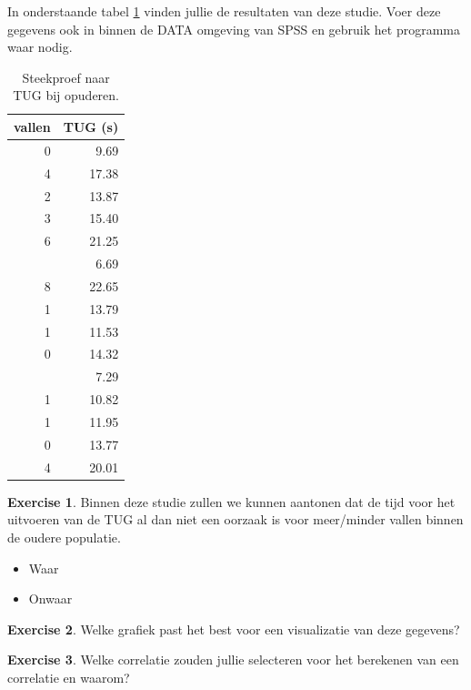 \documentclass[
]{book}
\providecommand{\tightlist}{%
  \setlength{\itemsep}{0pt}\setlength{\parskip}{0pt}}
\theoremstyle{definition}
\theoremstyle{definition}
\theoremstyle{definition}
\newtheorem{exercise}{Exercise}[chapter]
\theoremstyle{definition}
\theoremstyle{remark}
\begin{document}
In onderstaande tabel \ref{tab:TUG} vinden jullie de resultaten van deze studie. Voer deze gegevens ook in binnen de DATA omgeving van {SPSS} en gebruik het programma waar nodig.

\begin{table}

\caption{\label{tab:TUG}Steekproef naar TUG bij opuderen.}
\centering
\begin{tabular}[t]{rr}
\toprule
vallen & TUG (s)\\
\midrule
0 & 9.69\\
4 & 17.38\\
2 & 13.87\\
3 & 15.40\\
6 & 21.25\\
\addlinespace
1 & 6.69\\
8 & 22.65\\
1 & 13.79\\
1 & 11.53\\
0 & 14.32\\
\addlinespace
0 & 7.29\\
1 & 10.82\\
1 & 11.95\\
0 & 13.77\\
4 & 20.01\\
\bottomrule
\end{tabular}
\end{table}

\begin{exercise}

Binnen deze studie zullen we kunnen aantonen dat de tijd voor het uitvoeren van de TUG al dan niet een oorzaak is voor meer/minder vallen binnen de oudere populatie.

\begin{itemize}
\tightlist
\item
  Waar
\item
  Onwaar
\end{itemize}

\end{exercise}

\begin{exercise}
Welke grafiek past het best voor een visualizatie van deze gegevens?
\end{exercise}

\begin{exercise}
Welke correlatie zouden jullie selecteren voor het berekenen van een correlatie en waarom?
\end{exercise}
\end{document}
